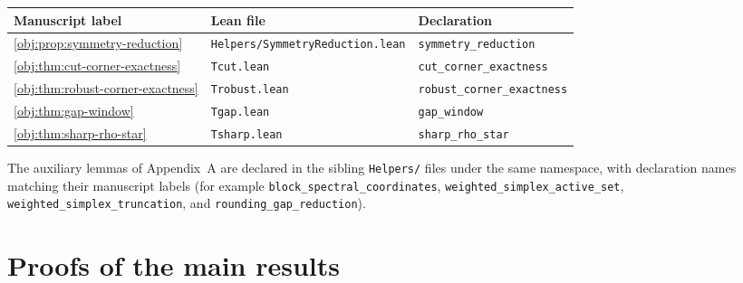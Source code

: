 \documentclass[11pt]{article}
\begin{document}
\begin{center}
\begin{tabular}{lll}
\textbf{Manuscript label} & \textbf{Lean file} & \textbf{Declaration} \\
\hline
\cref{obj:prop:symmetry-reduction} & \texttt{Helpers/SymmetryReduction.lean} & \texttt{symmetry\_reduction} \\
\cref{obj:thm:cut-corner-exactness} & \texttt{Tcut.lean} & \texttt{cut\_corner\_exactness} \\
\cref{obj:thm:robust-corner-exactness} & \texttt{Trobust.lean} & \texttt{robust\_corner\_exactness} \\
\cref{obj:thm:gap-window} & \texttt{Tgap.lean} & \texttt{gap\_window} \\
\cref{obj:thm:sharp-rho-star} & \texttt{Tsharp.lean} & \texttt{sharp\_rho\_star} \\
\end{tabular}
\end{center}

\noindent The auxiliary lemmas of Appendix~A are declared in the sibling \texttt{Helpers/} files under the same namespace, with declaration names matching their manuscript labels (for example \texttt{block\_spectral\_coordinates}, \texttt{weighted\_simplex\_active\_set}, \texttt{weighted\_simplex\_truncation}, and \texttt{rounding\_gap\_reduction}).


\section{Proofs of the main results}\label{sec:deferred-proofs}
\end{document}
